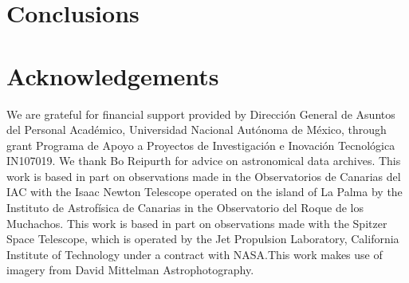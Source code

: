 \documentclass[useAMS, usenatbib, a4paper]{mnras}
\begin{document}
\section{Conclusions}
\label{sec:conclusions}

\section*{Acknowledgements}

We are grateful for financial support provided by Dirección General de
Asuntos del Personal Académico, Universidad Nacional Autónoma de
México, through grant Programa de Apoyo a Proyectos de Investigación e
Inovación Tecnológica IN107019.  We thank Bo Reipurth for advice on
astronomical data archives.  This work is based in part on
observations made in the Observatorios de Canarias del IAC with the
Isaac Newton Telescope operated on the island of La Palma by the
Instituto de Astrofísica de Canarias in the Observatorio del Roque de
los Muchachos. 
This work is based in part on observations made with the Spitzer Space
Telescope, which is operated by the Jet Propulsion Laboratory,
California Institute of Technology under a contract with NASA.\@ This
work makes use of imagery from David Mittelman Astrophotography.




\bsp	%
\label{lastpage}
\end{document}
